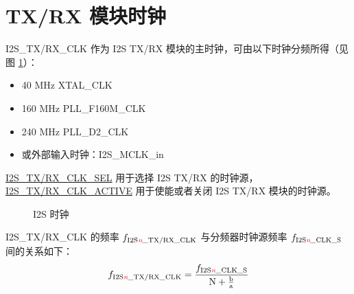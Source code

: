 \documentclass[main\_\_CN.tex]{subfiles}
\begin{document}
\section{TX/RX 模块时钟}\label{The Clock of I2S Module}

I2S\_TX/RX\_CLK 作为 I2S TX/RX 模块的主时钟，可由以下时钟分频所得（见图 \ref{Figure:i2s_clk}）：
\begin{itemize}
    \item 40 MHz XTAL\_CLK
    \item 160 MHz PLL\_F160M\_CLK
    \item 240 MHz PLL\_D2\_CLK
    \item 或外部输入时钟：I2S\_MCLK\_in
\end{itemize}

\hyperref[fielddesc:I2SRXCLKSEL]{I2S\_TX/RX\_CLK\_SEL} 用于选择 I2S TX/RX 的时钟源，\hyperref[fielddesc:I2SRXCLKACTIVE]{I2S\_TX/RX\_CLK\_ACTIVE} 用于使能或者关闭 I2S TX/RX 模块的时钟源。

\begin{figure}[H]
    \centering
    \caption{I2S 时钟}
    \label{Figure:i2s_clk}
\end{figure}

I2S\_TX/RX\_CLK 的频率 $f_{\textrm{I2S\textcolor{red}{\it{n}}\_TX/RX\_CLK}}$ 与分频器时钟源频率 $f_{\textrm{I2S\textcolor{red}{\it{n}}\_CLK\_S}}$ 间的关系如下：
$$f_{\textrm{I2S\textcolor{red}{\it{n}}\_TX/RX\_CLK}}=\frac{f_{\textrm{I2S\textcolor{red}{\it{n}}\_CLK\_S}}}{\textrm{N} + \frac{\textrm{b}}{\textrm{a}}}$$
\end{document}

